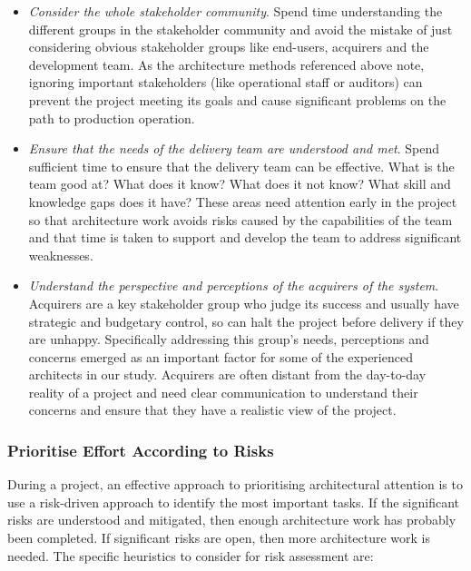 \begin{itemize}
	\item \emph{Consider the whole stakeholder community}. Spend time understanding the different groups in the stakeholder community and avoid the mistake of just considering obvious stakeholder groups like end-users, acquirers and the development team.  As the architecture methods referenced above note, ignoring important stakeholders (like operational staff or auditors) can prevent the project meeting its goals and cause significant problems on the path to production operation.
	\item \emph{Ensure that the needs of the delivery team are understood and met}.  Spend sufficient time to ensure that the delivery team can be effective.  What is the team good at?  What does it know?  What does it not know?  What skill and knowledge gaps does it have?  These areas need attention early in the project so that architecture work avoids risks caused by the capabilities of the team and that time is taken to support and develop the team to address significant weaknesses.
	\item \emph{Understand the perspective and perceptions of the acquirers of the system}.  Acquirers are a key stakeholder group who judge its success and usually have strategic and budgetary control, so can halt the project before delivery if they are unhappy.  Specifically addressing this group's needs, perceptions and concerns emerged as an important factor for some of the experienced architects in our study.  Acquirers are often distant from the day-to-day reality of a project and need clear communication to understand their concerns and ensure that they have a realistic view of the project.
\end{itemize}

\subsubsection{Prioritise Effort According to Risks}

During a project, an effective approach to prioritising architectural attention is to use a risk-driven approach to identify the most important tasks.  If the significant risks are understood and mitigated, then enough architecture work has probably been completed.  If significant risks are open, then more architecture work is needed. The specific heuristics to consider for risk assessment are:

